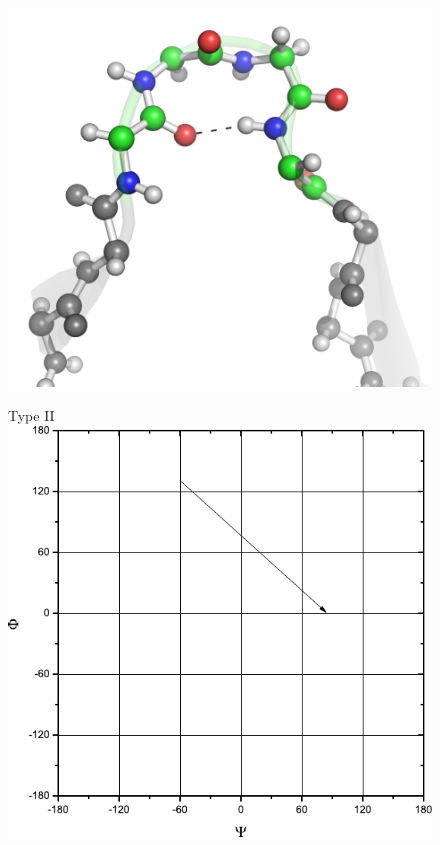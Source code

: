 \begin{figure}[p]
\begin{minipage}[b]{0.5\linewidth}
\centering
\includegraphics[width=1.0\textwidth]{./01-ProteinStructure/turns/beta-type-II.png}
\end{minipage}
\hspace{0.5cm}
\begin{minipage}[b]{0.3\linewidth}
\centering
Type II
\includegraphics[width=1.0\textwidth]{./01-ProteinStructure/turns/beta-ram-type-II.pdf}
\end{minipage}


\end{figure}
